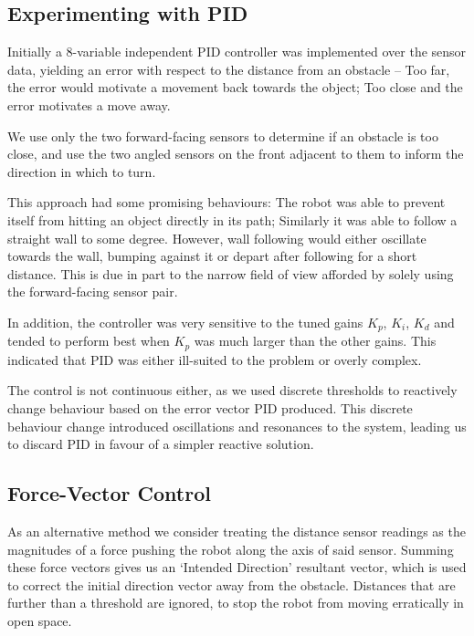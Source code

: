\documentclass[11pt, a4paper]{article}
\begin{document}
\subsection{Experimenting with PID}


Initially a 8-variable independent PID controller was implemented over the sensor data, 
yielding an error with respect to the distance from an obstacle -- Too far, the error would 
motivate a movement back towards the object; Too close and the error motivates a move away.

We use only the two forward-facing sensors to determine if an obstacle is too close, 
and use the two angled sensors on the front adjacent to them to inform the direction in 
which to turn.

This approach had some promising behaviours: The robot was able to prevent itself 
from hitting an object directly in its path; Similarly it was able to follow 
a straight wall to some degree. However, wall following would either oscillate 
towards the wall, bumping against it or depart after following for a short distance.
This is due in part to the narrow field of view afforded by solely using the forward-facing
sensor pair.

In addition, the controller was very sensitive to the tuned gains ${K_p}$, ${K_i}$,
${K_d}$ and tended to perform best when ${K_p}$ was much larger than the other gains.
This indicated that PID was either ill-suited to the problem or overly complex.

The control is not continuous either, as we used discrete thresholds to reactively 
change behaviour based on the error vector PID produced. This discrete behaviour 
change introduced oscillations and resonances to the system, leading us to discard 
PID in favour of a simpler reactive solution.


\subsection{Force-Vector Control}

As an alternative method we consider treating the distance sensor readings as the 
magnitudes of a force pushing the robot along the axis of said sensor. Summing these 
force vectors gives us an `Intended Direction' resultant vector, which is used to 
correct the initial direction vector away from the obstacle. Distances that are 
further than a threshold are ignored, to stop the robot from moving erratically in 
open space.
\end{document}
